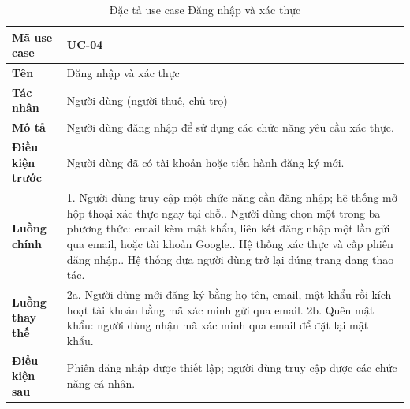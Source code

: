 \begin{table}[!ht]
\centering
\caption{Đặc tả use case Đăng nhập và xác thực}
\label{tab:uc-auth}
\begin{tabular}{p{} p{}}
\hline
\textbf{Mã use case} & UC-04 \\
\hline
\textbf{Tên} & Đăng nhập và xác thực \\
\hline
\textbf{Tác nhân} & Người dùng (người thuê, chủ trọ) \\
\hline
\textbf{Mô tả} & Người dùng đăng nhập để sử dụng các chức năng yêu cầu xác thực. \\
\hline
\textbf{Điều kiện trước} & Người dùng đã có tài khoản hoặc tiến hành đăng ký mới. \\
\hline
\textbf{Luồng chính} & 1. Người dùng truy cập một chức năng cần đăng nhập; hệ thống mở hộp thoại xác thực ngay tại chỗ.\newline
2. Người dùng chọn một trong ba phương thức: email kèm mật khẩu, liên kết đăng nhập một lần gửi qua email, hoặc tài khoản Google.\newline
3. Hệ thống xác thực và cấp phiên đăng nhập.\newline
4. Hệ thống đưa người dùng trở lại đúng trang đang thao tác. \\
\hline
\textbf{Luồng thay thế} & 2a. Người dùng mới đăng ký bằng họ tên, email, mật khẩu rồi kích hoạt tài khoản bằng mã xác minh gửi qua email.\newline
2b. Quên mật khẩu: người dùng nhận mã xác minh qua email để đặt lại mật khẩu. \\
\hline
\textbf{Điều kiện sau} & Phiên đăng nhập được thiết lập; người dùng truy cập được các chức năng cá nhân. \\
\hline
\end{tabular}
\end{table}

